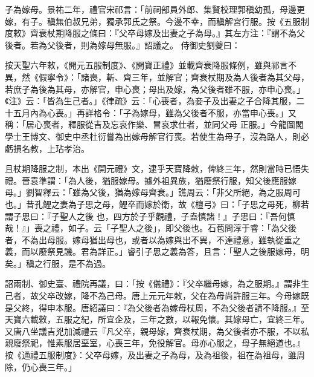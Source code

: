 \begin{pinyinscope}
 子為嫁母。景祐二年，禮官宋祁言：「前祠部員外郎、集賢校理郭稹幼孤，母邊更嫁，有子。稹無伯叔兄弟，獨承郭氏之祭。今邊不幸，而稹解宮行服。按《五服制度敕》齊衰杖期降服之條曰：『父卒母嫁及出妻之子為母。』其左方注：『謂不為父後者。若為父後者，則為嫁母無服。』詔議之。
 侍御史劉夔曰：



 按天聖六年敕，《開元五服制度》、《開寶正禮》並載齊衰降服條例，雖與祁言不異，然《假寧令》：「諸喪，斬、齊三年，並解官；齊衰杖期及為人後者為其父母，若庶子為後為其母，亦解官，申心喪；母出及嫁，為父後者雖不服，亦申心喪。」《注》云：「皆為生己者。」《律疏》云：「心喪者，為妾子及出妻之子合降其服，二十五月內為心喪。」再詳格令：「子為嫁母，雖為父後者不服，亦當申心喪。」又稱：「居心喪者，釋服從吉及忘哀作樂、冒哀求仕者，並同父母
 正服。」今龍圖閣學士王博文、御史中丞杜衍嘗為出嫁母解官行喪。若使生為母子，沒為路人，則必虧損名教，上玷孝治。



 且杖期降服之制，本出《開元禮》文，逮乎天寶降敕，俾終三年，然則當時已悟失禮。晉袁準謂：「為人後，猶服嫁母。據外祖異族，猶廢祭行服，知父後應服嫁母。」劉智釋云：「雖為父後，猶為嫁母齊衰。」譙周云：「非父所絕，為之服周可也。」昔孔鯉之妻為子思之母，鯉卒而嫁於衛，故《檀弓》曰：「子思之母死，柳若謂子思曰：『子聖人之後
 也，四方於子乎觀禮，子盍慎諸！』子思曰：『吾何慎哉！』」喪之禮，如子。云「子聖人之後」，即父後也。石苞問淳于睿：「為父後者，不為出母服。嫁母猶出母也，或者以為嫁與出不異，不達禮意，雖執從重之義，而以廢祭見譏。君為詳正。」睿引子思之義為答，且言：「聖人之後服嫁母，明矣。」稹之行服，是不為過。



 詔兩制、御史臺、禮院再議，曰：「按《儀禮》：『父卒繼母嫁，為之服期。』謂非生己者，故父卒改嫁，降不為己母。唐上元元年敕，父在為母尚許服三年。今母嫁既
 是父終，得申本服。唐紹議曰：『為父後者為嫁母杖周，不為父後者請不降服。』至天寶六載敕，五服之紀，所宜企及，三年之數，以報免懷。其嫁母亡，宜終三年。又唐八坐議吉兇加減禮云『凡父卒，親母嫁，齊衰杖期，為父後者亦不服，不以私親廢祭祀，惟素服居堊室，心喪三年，免役解官。母亦心服之，母子無絕道也。』按《通禮五服制度》：父卒母嫁，及出妻之子為母，及為祖後，祖在為祖母，雖周除，仍心喪三年。」




\end{pinyinscope}
